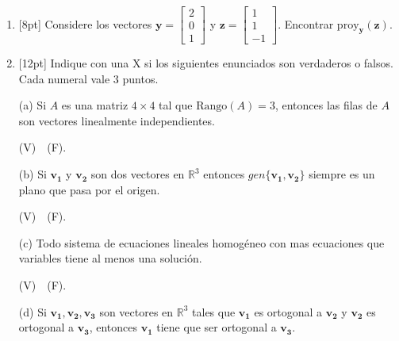 \documentclass[11pt]{article}
\begin{document}
\begin{enumerate}
\vspace{4pt}
\noindent
\begin{minipage}[t]{0.5\linewidth}
$(d)$ $I$ y $III$ únicamente
\end{minipage}%
\begin{minipage}[t]{0.5\linewidth}
$(e)$ Ninguna de las anteriores
\end{minipage}

\item{}[8pt] Considere los vectores $\mathbf{y} = \begin{bmatrix}2\\0\\1\end{bmatrix}$ y $\mathbf{z} = \begin{bmatrix}1\\1\\-1\end{bmatrix}$. Encontrar $\mathrm{proy}_{\mathbf{y}}(\mathbf{z})$.

\vspace{4pt}

\item{}[12pt] Indique con una X si los siguientes enunciados son verdaderos o falsos. Cada numeral vale 3 puntos.

\vspace{6pt}
\noindent (a) Si $A$ es una matriz $4\times 4$ tal que $\mathrm{Rango}(A)=3$, entonces las filas de $A$ son vectores linealmente independientes.

\noindent (V)\ \dotfill\ (F).\ \dotfill

\vspace{6pt}
\noindent (b) Si $\mathbf{v_1}$ y $\mathbf{v_2}$ son dos vectores en $\mathbb{R}^3$ entonces $gen\{\mathbf{v_1},\mathbf{v_2}\}$ siempre es un plano que pasa por el origen.

\noindent (V)\ \dotfill\ (F).\ \dotfill

\vspace{6pt}
\noindent (c) Todo sistema de ecuaciones lineales homogéneo con mas ecuaciones que variables tiene al menos una solución.

\noindent (V)\ \dotfill\ (F).\ \dotfill

\vspace{6pt}
\noindent (d) Si $\mathbf{v_1}, \mathbf{v_2}, \mathbf{v_3}$ son vectores en $\mathbb{R}^3$ tales que $\mathbf{v_1}$ es ortogonal a $\mathbf{v_2}$ y $\mathbf{v_2}$ es ortogonal a $\mathbf{v_3}$, entonces $\mathbf{v_1}$ tiene que ser ortogonal a $\mathbf{v_3}$.


\end{enumerate}
\end{document}
